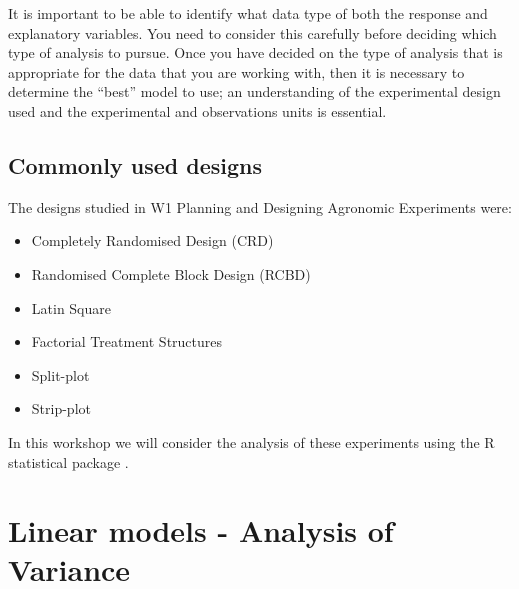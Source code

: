 \documentclass[a4paper, 10pt, fleqn, twosided]{memoir}
\begin{document}
It is important to be able to identify what data type of both the response and
explanatory variables. You need to consider this carefully before deciding
which type of analysis to pursue. Once you have decided on the type of analysis
that is appropriate for the data that you are working with, then it is
necessary to determine the ``best'' model to use; an understanding of the
experimental design used and the experimental and observations units is
essential.



\section{Commonly used designs}


The designs studied in W1 Planning and Designing Agronomic Experiments were:

\begin{itemize}
\item Completely Randomised Design (CRD)
\item Randomised Complete Block Design (RCBD)
\item Latin Square
\item Factorial Treatment Structures
\item Split-plot
\item Strip-plot
\end{itemize}

In this workshop we will consider the analysis of these experiments using the R statistical package \cite{r}.

\clearpage
\chapter{Linear models - Analysis of Variance}
\end{document}
